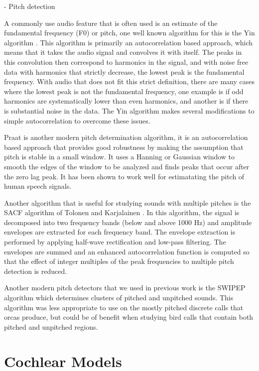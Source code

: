 - Pitch detection


A commonly use audio feature that is often used is an estimate of the
fundamental frequency (F0) or pitch, one well known algorithm for this
is the Yin algorithm \cite{cheveigne02}.  This algorithm is primarily
an autocorrelation based approach, which means that it takes the audio
signal and convolves it with itself.  The peaks in this convolution
then correspond to harmonics in the signal, and with noise free data
with harmonics that strictly decrease, the lowest peak is the
fundamental frequency.  With audio that does not fit this strict
definition, there are many cases where the lowest peak is not the
fundamental frequency, one example is if odd harmonics are
systematically lower than even harmonics, and another is if there is
substantial noise in the data.  The Yin algorithm makes several
modifications to simple autocorrelation to overcome these issues.

Praat \cite{boersma93} is another modern pitch determination
algorithm, it is an autocorrelation based approach that provides good
robustness by making the assumption that pitch is stable in a small
window.  It uses a Hanning or Gaussian window to smooth the edges of
the window to be analyzed and finds peaks that occur after the zero
lag peak.  It has been shown to work well for estimatating the pitch
of human speech signals.

Another algorithm that is useful for studying sounds with multiple
pitches is the SACF algorithm of Tolonen and Karjalainen
\cite{tolonen00}.  In this algorithm, the signal is decomposed into
two frequency bands (below and above 1000 Hz) and amplitude envelopes
are extracted for each frequency band. The envelope extraction is
performed by applying half-wave rectification and low-pass filtering.
The envelopes are summed and an enhanced autocorrelation function is
computed so that the effect of integer multiples of the peak
frequencies to multiple pitch detection is reduced.

Another modern pitch detectors that we used in previous work is the
SWIPEP \cite{camachophd} algorithm which determines clusters of
pitched and unpitched sounds.  This algorithm was less appropriate to
use on the mostly pitched discrete calls that orcas produce, but could
be of benefit when studying bird calls that contain both pitched and
unpitched regions.

\section{Cochlear Models}

